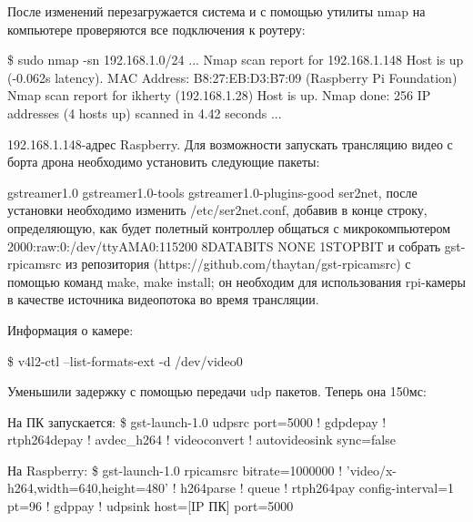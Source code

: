 После изменений перезагружается система и с помощью утилиты nmap на компьютере проверяются все подключения к роутеру:
\begin{MyCode}
\$ sudo nmap -sn 192.168.1.0/24
...
Nmap scan report for 192.168.1.148
Host is up (-0.062s latency).
MAC Address: B8:27:EB:D3:B7:09 (Raspberry Pi Foundation)
Nmap scan report for ikherty (192.168.1.28)
Host is up.
Nmap done: 256 IP addresses (4 hosts up) scanned in 4.42 seconds
...
\end{MyCode}
192.168.1.148-адрес Raspberry.
Для возможности запускать трансляцию видео с борта дрона необходимо установить следующие пакеты:
\begin{MyCode}
	gstreamer1.0
	gstreamer1.0-tools
	gstreamer1.0-plugins-good
	ser2net, после установки необходимо изменить /etc/ser2net.conf, добавив в конце строку, определяющую, как будет полетный контроллер общаться с микрокомпьютером
	2000:raw:0:/dev/ttyAMA0:115200 8DATABITS NONE 1STOPBIT
	и собрать gst-rpicamsrc из репозитория (https://github.com/thaytan/gst-rpicamsrc) с помощью команд make, make install; он необходим для использования rpi-камеры в качестве источника видеопотока во время трансляции.
\end{MyCode}

Информация о камере:
\begin{MyCode}
\$ v4l2-ctl --list-formats-ext -d /dev/video0
\end{MyCode}

Уменьшили задержку с помощью передачи udp пакетов. Теперь она 150мс:
\begin{MyCode}
На ПК запускается:
\$ gst-launch-1.0 udpsrc port=5000 ! gdpdepay ! rtph264depay ! avdec_h264 ! videoconvert ! autovideosink sync=false

На Raspberry:
\$ gst-launch-1.0 rpicamsrc bitrate=1000000 ! 'video/x-h264,width=640,height=480' ! h264parse ! queue ! rtph264pay config-interval=1 pt=96 ! gdppay ! udpsink host=[IP ПК] port=5000
\end{MyCode}



